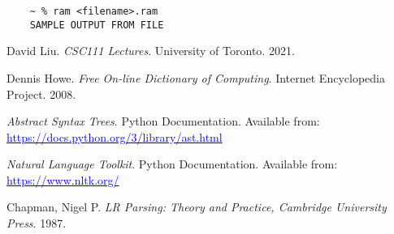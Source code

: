 \documentclass[fontsize=11pt]{article}
\newcommand{\blue}[1]{\textcolor{blue}{#1}}
\newcommand{\link}[1]{\href{#1}{\blue{#1}}}
\begin{document}
\begin{verbatim}
    ~ % ram <filename>.ram
    SAMPLE OUTPUT FROM FILE
\end{verbatim}


\begin{thebibliography}{9}

David Liu. \textit{CSC111 Lectures}. University of Toronto. 2021.

Dennis Howe. \textit{Free On-line Dictionary of Computing}. Internet Encyclopedia Project. 2008.

\textit{Abstract Syntax Trees}. Python Documentation. Available from: \link{https://docs.python.org/3/library/ast.html}

\textit{Natural Language Toolkit}. Python Documentation. Available from: \link{https://www.nltk.org/}

Chapman, Nigel P. \textit{LR Parsing: Theory and Practice, Cambridge University Press}. 1987.

\end{thebibliography}
\end{document}
